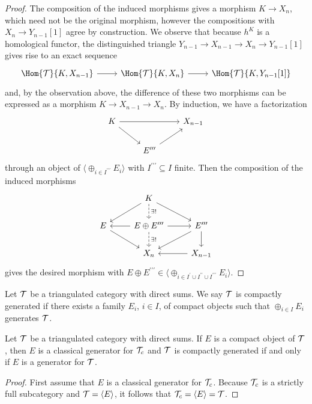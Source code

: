 \documentclass[10pt]{amsart}
\begin{document}
\begin{lem}
\begin{proof}
    The composition of the induced morphisms gives a morphism $K \rightarrow X_n$, which need not be the original morphism, however the compositions with $X_n \rightarrow Y_{n-1}[1]$ agree by construction.
    We observe that because $h^{K}$ is a homological functor, the distinguished triangle $Y_{n-1} \rightarrow X_{n-1} \rightarrow X_{n} \rightarrow Y_{n-1}[1]$ gives rise to an exact sequence
    $$\begin{tikzcd}
      \Hom{\T}{K,X_{n-1}} \arrow{r} & \Hom{\T}{K,X_n} \arrow{r} & \Hom{\T}{K,Y_{n-1}[1]}
    \end{tikzcd}$$
    and, by the observation above, the difference of these two morphisms can be expressed as a morphism $K \rightarrow X_{n-1} \rightarrow X_n$.
    By induction, we have a factorization 
    $$\begin{tikzcd}
      K \arrow{rd}\arrow{rr} && X_{n-1}\\
      & E^{\prime\prime\prime}\arrow{ur}
    \end{tikzcd}$$
    through an object of $\langle \oplus_{i \in I^{\prime\prime\prime}} E_i\rangle$ with $I^{\prime\prime\prime} \subseteq I$ finite.
    Then the composition of the induced morphisms
    $$\begin{tikzcd}
      & K\arrow[dashed]{d}{\exists !}\arrow{ld}\arrow{rd}\\
      E\arrow{rd} & E \oplus E^{\prime\prime\prime} \arrow[dashed]{d}{\exists!}\arrow{r}\arrow{l} & E^{\prime\prime\prime}\arrow{d}\arrow{ld}\\
      & X_n & \arrow{l}X_{n-1}
    \end{tikzcd}$$
    gives the desired morphism with $E \oplus E^{\prime\prime\prime} \in \langle \oplus_{i \in I^\prime \cup I^{\prime\prime} \cup I^{\prime\prime\prime}} E_i\rangle.$
  \end{proof}
\end{lem}

\begin{defn}
  Let $\mathcal{T}$ be a triangulated category with direct sums.
  We say $\mathcal{T}$ is compactly generated if there exists a family $E_i$, $i \in I$, of compact objects such that $\oplus_{i \in I} E_i$ generates $\mathcal{T}$.
\end{defn}

\begin{prop}
  Let $\mathcal{T}$ be a triangulated category with direct sums.
  If $E$ is a compact object of $\mathcal{T}$, then
  $E$ is a classical generator for $\mathcal{T}_c$ and $\mathcal{T}$ is compactly generated 
  if and only if
  $E$ is a generator for $\mathcal{T}$.
  
  \begin{proof}
    First assume that $E$ is a classical generator for $\mathcal{T}_c$.
    Because $\mathcal{T}_c$ is a strictly full subcategory and $\mathcal{T} = \langle E \rangle$, it follows that $\mathcal{T}_c = \langle E \rangle = \mathcal{T}$.
    
  \end{proof}
\end{prop}
\end{document}
